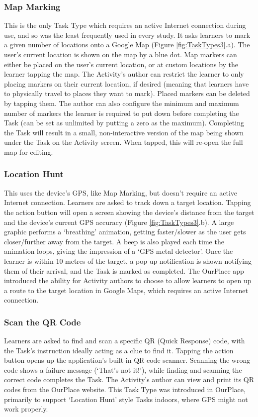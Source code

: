 \subsubsection*{Map Marking}
This is the only Task Type which requires an active Internet connection during use, and so was the least frequently used in every study. It asks learners to mark a given number of locations onto a Google Map (Figure \ref{fig:TaskTypes3}.a). The user's current location is shown on the map by a blue dot. Map markers can either be placed on the user's current location, or at custom locations by the learner tapping the map. The Activity's author can restrict the learner to only placing markers on their current location, if desired (meaning that learners have to physically travel to places they want to mark). Placed markers can be deleted by tapping them. The author can also configure the minimum and maximum number of markers the learner is required to put down before completing the Task (can be set as unlimited by putting a zero as the maximum). Completing the Task will result in a small, non-interactive version of the map being shown under the Task on the Activity screen. When tapped, this will re-open the full map for editing.

\subsubsection*{Location Hunt}
This uses the device's GPS, like Map Marking, but doesn't require an active Internet connection. Learners are asked to track down a target location. Tapping the action button will open a screen showing the device's distance from the target and the device's current GPS accuracy (Figure \ref{fig:TaskTypes3}.b). A large graphic performs a `breathing' animation, getting faster/slower as the user gets closer/further away from the target. A beep is also played each time the animation loops, giving the impression of a `GPS metal detector'. Once the learner is within 10 metres of the target, a pop-up notification is shown notifying them of their arrival, and the Task is marked as completed. The OurPlace app introduced the ability for Activity authors to choose to allow learners to open up a route to the target location in Google Maps, which requires an active Internet connection.

\subsubsection*{Scan the QR Code}
Learners are asked to find and scan a specific QR (Quick Response) code, with the Task's instruction ideally acting as a clue to find it. Tapping the action button opens up the application's built-in QR code scanner. Scanning the wrong code shows a failure message (`That's not it!'), while finding and scanning the correct code completes the Task. The Activity's author can view and print its QR codes from the OurPlace website. This Task Type was introduced in OurPlace, primarily to support `Location Hunt' style Tasks indoors, where GPS might not work properly.

